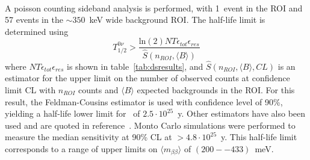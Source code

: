 \documentclass[/main.tex]{subfiles}
\begin{document}
\\
A poisson counting sideband analysis is performed, with 1~event in the ROI and 57 events in the $\sim350$~keV wide background ROI.
The half-life limit is determined using
\begin{equation}
  T_{1/2}^{0\nu}>\frac{\mathrm{ln}(2)NT\epsilon_{tot}\epsilon_{res}}{\hat{S}(n_{ROI}, \langle B\rangle)}
\end{equation}
where $NT\epsilon_{tot}\epsilon_{res}$ is shown in table~\ref{tab:dsresults}, and $\hat{S}(n_{ROI}, \langle B\rangle, CL)$ is an estimator for the upper limit on the number of observed counts at confidence limit CL with $n_{ROI}$ counts and $\langle B\rangle$ expected backgrounds in the ROI.
For this result, the Feldman-Cousins estimator\cite{feldmancousins} is used with confidence level of 90\%, yielding a half-life lower limit for  \znbb\ of $2.5\cdot10^{25}$~y.
Other estimators have also been used and are quoted in reference~\cite{mjd2019}.
Monto Carlo simulations were performed to measure the median sensitivity at 90\% CL at $>4.8\cdot10^{25}$~y.
This half-life limit corresponds to a range of upper limits on $\langle m_{\beta\beta}\rangle$ of $(200--433)$~meV.
\\
\end{document}
